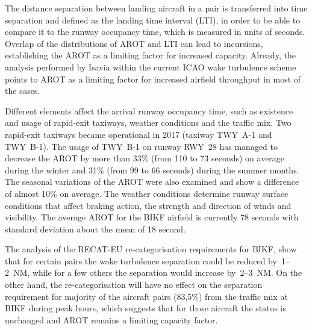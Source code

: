 The distance separation between landing aircraft in a pair is transferred into time separation and defined as the landing time interval (LTI), in order to be able to compare it to the runway occupancy time, which is measured in units of seconds. Overlap of the distributions of AROT and LTI can lead to incursions, establishing the AROT as a limiting factor for increased capacity.
Already, the analysis performed by Isavia within the current ICAO wake turbulence scheme points to AROT as a limiting factor for increased airfield throughput in most of the cases.  

Different elements affect the arrival runway occupancy time, such as existence and usage of rapid-exit taxiways, weather conditions and the traffic mix. Two rapid-exit taxiways became operational in 2017 (taxiway TWY~A-1 and TWY~B-1). The usage of TWY~B-1 on runway RWY~28 has managed to decrease the AROT by more than 33\% (from 110 to 73 seconds) on average during the winter and 31\% (from 99 to 66 seconds) during the summer months. The seasonal variations of the AROT were also examined and show a difference of almost 10\% on average. The weather conditions determine runway surface conditions that affect braking action, the strength and direction of winds and visibility. The average AROT for the BIKF airfield is currently 78 seconds with standard
deviation about the mean of 18 second.


The analysis of the RECAT-EU re-categorisation requirements for BIKF, show that for certain pairs the wake turbulence separation could be reduced by~1--2~NM, while for a few others the separation would increase by~2--3~NM. On the other hand, the re-categorisation will have no effect on the separation requirement for majority of the aircraft pairs (83,5\%) from the traffic mix at BIKF during peak hours, which suggests that for those aircraft the status is unchanged and AROT remains a limiting capacity factor. 

